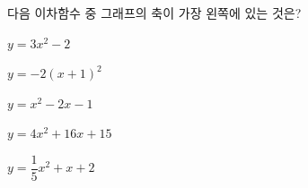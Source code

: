 다음 이차함수 중 그래프의 축이 가장 왼쪽에 있는 것은?
\begin{choicesii}{\rule[-3ex]{0pt}{8ex}$y=3x^2-2$}{\rule[-3ex]{0pt}{8ex}$y=-2(x+1)^2$}{\rule[-3ex]{0pt}{8ex}$y=x^2-2x-1$}{\rule[-3ex]{0pt}{8ex}$y=4x^2+16x+15$}{\rule[-3ex]{0pt}{8ex}$y=\dfrac{1}{5}x^2+x+2$}\end{choicesii}
